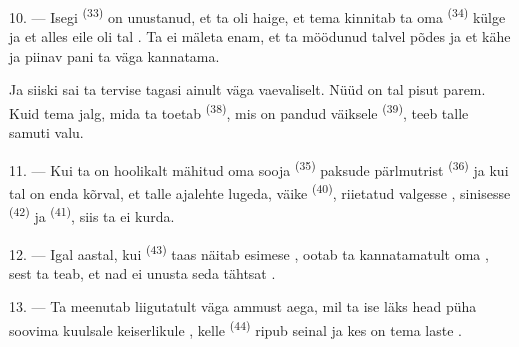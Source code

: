 \VUsaut{4.2mm}
\VUsaut{3.0mm}

10. --- Isegi  \textsuperscript{(33)} on unustanud, et ta oli haige, et
tema  kinnitab ta oma  \textsuperscript{(34)} külge ja et
alles eile oli tal . Ta ei mäleta enam, et ta möödunud
talvel põdes  ja et kähe ja piinav  pani ta väga
kannatama.

Ja siiski sai ta tervise tagasi ainult väga vaevaliselt. Nüüd on tal pisut parem. Kuid
tema jalg, mida ta toetab  \textsuperscript{(38)}, mis on pandud väiksele
 \textsuperscript{(39)}, teeb talle samuti valu.

11. --- Kui ta on hoolikalt mähitud oma sooja 
\textsuperscript{(35)} paksude pärlmutrist  \textsuperscript{(36)} ja
kui tal on enda kõrval, et talle ajalehte lugeda, väike 
\textsuperscript{(40)}, riietatud valgesse , sinisesse 
\textsuperscript{(42)} ja  \textsuperscript{(41)}, siis ta ei kurda.

12. --- Igal aastal, kui  \textsuperscript{(43)} taas näitab esimese
 , ootab ta kannatamatult oma ,
sest ta teab, et nad ei unusta seda tähtsat .

13. --- Ta meenutab liigutatult väga ammust aega, mil ta ise läks head püha soovima
kuulsale keiserlikule , kelle  \textsuperscript{(44)}
ripub seinal ja kes on tema laste .

\VUsaut{6.0mm}
\VUfilet{22mm}
